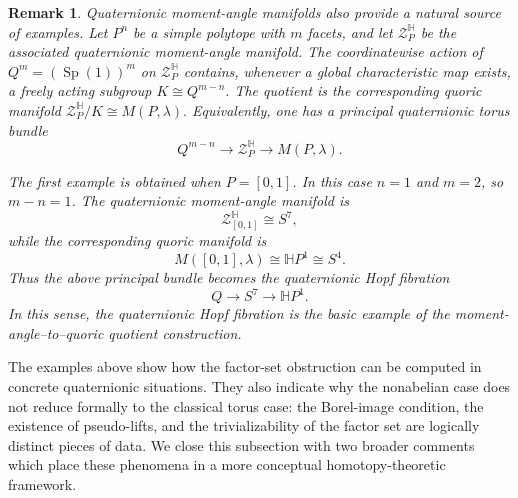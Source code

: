 \documentclass[11pt,a4paper]{article}
\numberwithin{equation}{section}
\newtheorem{remark}[definition]{Remark}
\theoremstyle{named}
\begin{document}
\begin{remark}
\label{rem:moment-angle-quoric-examples}
Quaternionic moment-angle manifolds also provide a natural source of examples. Let \(P^n\) be a simple polytope with \(m\) facets, and let \(\mathcal Z_P^{\mathbb H}\) be the associated quaternionic moment-angle manifold. The coordinatewise action of \(Q^m=(\operatorname{Sp}(1))^m\) on \(\mathcal Z_P^{\mathbb H}\) contains, whenever a global characteristic map exists, a freely acting subgroup \(K\cong Q^{m-n}.\) The quotient is the corresponding quoric manifold \(\mathcal Z_P^{\mathbb H}/K\cong M(P,\lambda).\) Equivalently, one has a principal quaternionic torus bundle
\[
Q^{m-n}
\longrightarrow
\mathcal Z_P^{\mathbb H}
\longrightarrow
M(P,\lambda).
\]

The first example is obtained when \(P=[0,1]\). In this case \(n=1\) and \(m=2\), so \(m-n=1\). The quaternionic moment-angle manifold is
\[
\mathcal Z_{[0,1]}^{\mathbb H}\cong S^7,
\]
while the corresponding quoric manifold is
\[
M([0,1],\lambda)\cong\mathbb H P^1\cong S^4.
\]
Thus the above principal bundle becomes the quaternionic Hopf fibration
\[
Q\longrightarrow S^7\longrightarrow \mathbb H P^1.
\]
In this sense, the quaternionic Hopf fibration is the basic example of the moment-angle--to--quoric quotient construction.
\end{remark}

The examples above show how the factor-set obstruction can be computed in concrete quaternionic situations. They also indicate why the nonabelian case does not reduce formally to the classical torus case: the Borel-image condition, the existence of pseudo-lifts, and the trivializability of the factor set are logically distinct pieces of data. We close this subsection with two broader comments which place these phenomena in a more conceptual homotopy-theoretic framework.
\end{document}
